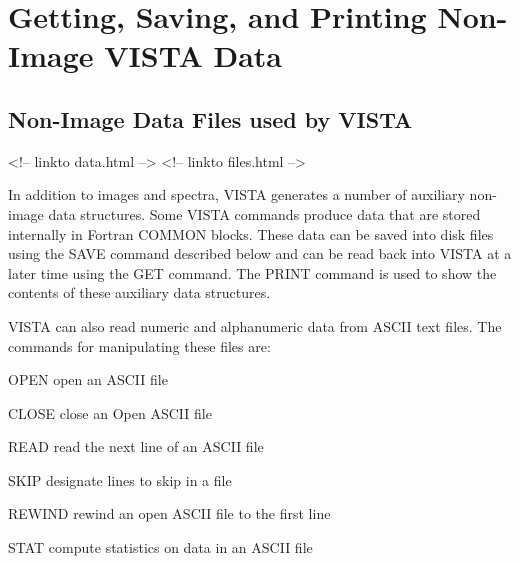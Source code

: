 \chapter{Getting, Saving, and Printing Non-Image VISTA Data} 

%
%

\section{Non-Image Data Files used by VISTA}
\begin{rawhtml}
<!-- linkto data.html -->
<!-- linkto files.html -->
\end{rawhtml}

In addition to images and spectra, VISTA generates a number of auxiliary
non-image data structures.  Some VISTA commands produce data that are
stored internally in Fortran COMMON blocks.  These data can be saved into
disk files using the SAVE command described below and can be read back into
VISTA at a later time using the GET command.  The PRINT command is used to
show the contents of these auxiliary data structures.

VISTA can also read numeric and alphanumeric data from ASCII text files.
The commands for manipulating these files are:
\begin{example}
  \item[OPEN]{open an ASCII file}
  \item[CLOSE]{close an Open ASCII file}
  \item[READ]{read the next line of an ASCII file}
  \item[SKIP]{designate lines to skip in a file}
  \item[REWIND]{rewind an open ASCII file to the first line}
  \item[STAT]{compute statistics on data in an ASCII file}
\end{example}


